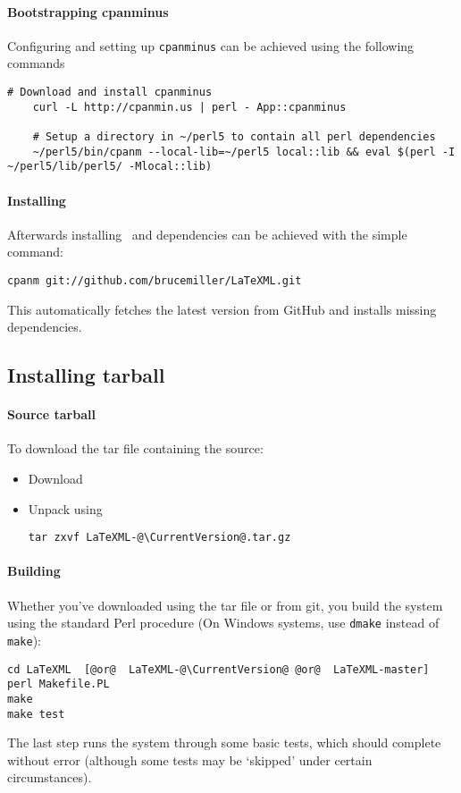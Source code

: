\documentclass{article}
\begin{document}
\paragraph{Bootstrapping cpanminus} Configuring and setting up \texttt{cpanminus} can be achieved using the following commands
\begin{lstlisting}[style=shell]
    # Download and install cpanminus
    curl -L http://cpanmin.us | perl - App::cpanminus
    
    # Setup a directory in ~/perl5 to contain all perl dependencies
    ~/perl5/bin/cpanm --local-lib=~/perl5 local::lib && eval $(perl -I ~/perl5/lib/perl5/ -Mlocal::lib)
\end{lstlisting}

\paragraph{Installing} Afterwards installing \LaTeXML\ and dependencies can be achieved with the 
simple command:
\begin{lstlisting}[style=shell]
    cpanm git://github.com/brucemiller/LaTeXML.git
\end{lstlisting}
This automatically fetches the latest version from GitHub and installs 
missing dependencies. 

\subsection{Installing tarball}\label{install.tarball}
\paragraph{Source tarball}\label{source.tarball}
To download the tar file containing the source:
\begin{itemize}
\item Download \CurrentTarball
\item Unpack using
\begin{lstlisting}[style=shell]
tar zxvf LaTeXML-@\CurrentVersion@.tar.gz
\end{lstlisting}
\end{itemize}

\paragraph{Building}\label{build.source}
Whether you've downloaded using the tar file or from git,
you build the system using the standard Perl procedure
(On Windows systems, use \texttt{dmake} instead of \texttt{make}):
\begin{lstlisting}[style=shell]
cd LaTeXML  [@or@  LaTeXML-@\CurrentVersion@ @or@  LaTeXML-master]
perl Makefile.PL
make
make test
\end{lstlisting}
The last step runs the system through some basic tests,
which should complete without error (although some tests may be `skipped'
under certain circumstances).
\end{document}
